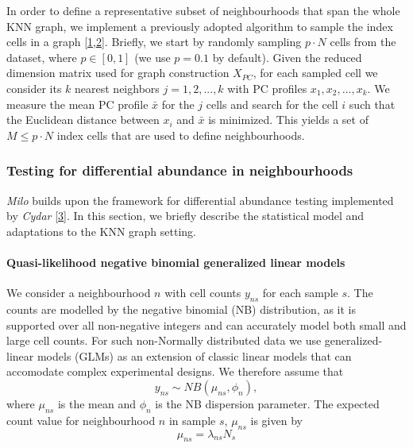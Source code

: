 \documentclass[
]{article}
\begin{document}
In order to define a representative subset of neighbourhoods that span the whole KNN graph, we implement a previously adopted algorithm to sample the index cells in a graph {[}\protect\hyperlink{ref-gutTrajectoriesCellcycleProgression2015}{1},\protect\hyperlink{ref-settyWishboneIdentifiesBifurcating2016}{2}{]}.
Briefly, we start by randomly sampling \(p \cdot N\) cells from the dataset, where \(p \in [0,1]\) (we use \(p = 0.1\) by default).
Given the reduced dimension matrix used for graph construction \(X_{PC}\), for each sampled cell we consider its \(k\) nearest neighbors \(j = 1,2,...,k\) with PC profiles \({x_1, x_2, ... , x_k}\). We measure the mean PC profile \(\bar{x}\) for the \(j\) cells and search for the cell \(i\) such that the Euclidean distance between \(x_i\) and \(\bar{x}\) is minimized. This yields a set of \(M \leq p \cdot N\) index cells that are used to define neighbourhoods.

\hypertarget{testing-for-differential-abundance-in-neighbourhoods}{%
\subsubsection{Testing for differential abundance in neighbourhoods}\label{testing-for-differential-abundance-in-neighbourhoods}}

\emph{Milo} builds upon the framework for differential abundance testing implemented by \emph{Cydar} {[}\protect\hyperlink{ref-lunTestingDifferentialAbundance2017}{3}{]}. In this section, we briefly describe the statistical model and adaptations to the KNN graph setting.

\hypertarget{quasi-likelihood-negative-binomial-generalized-linear-models}{%
\paragraph*{Quasi-likelihood negative binomial generalized linear models}\label{quasi-likelihood-negative-binomial-generalized-linear-models}}

We consider a neighbourhood \(n\) with cell counts \(y_{ns}\) for each sample \(s\). The counts are modelled by the negative binomial (NB) distribution, as it is supported over all non-negative integers and can accurately model both small and large cell counts. For such non-Normally distributed data we use generalized-linear models (GLMs) as an extension of classic linear models that can accomodate complex experimental designs. We therefore assume that
\[
y_{ns} \sim NB(\mu_{ns},\phi_{n}),
\]
where \(\mu_{ns}\) is the mean and \(\phi_{n}\) is the NB dispersion parameter.
The expected count value for neighbourhood \(n\) in sample \(s\), \(\mu_{ns}\) is given by
\[
\mu_{ns} = \lambda_{ns}N_s
\]
\end{document}
